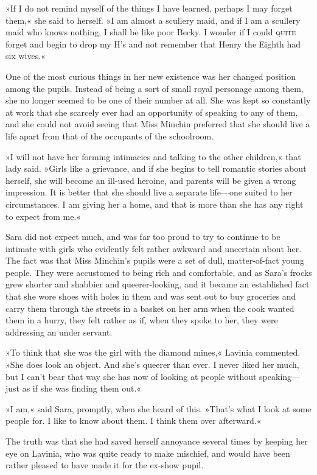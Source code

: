 »If I do not remind myself of the things I have learned, perhaps I may forget them,« she said to herself. »I am almost a scullery maid, and if I am a scullery maid who knows nothing, I shall be like poor Becky. I wonder if I could \textsc{quite} forget and begin to drop my H's and not remember that Henry the Eighth had six wives.«

One of the most curious things in her new existence was her changed position among the pupils. Instead of being a sort of small royal personage among them, she no longer seemed to be one of their number at all. She was kept so constantly at work that she scarcely ever had an opportunity of speaking to any of them, and she could not avoid seeing that Miss Minchin preferred that she should live a life apart from that of the occupants of the schoolroom.

»I will not have her forming intimacies and talking to the other children,« that lady said. »Girls like a grievance, and if she begins to tell romantic stories about herself, she will become an ill-used heroine, and parents will be given a wrong impression. It is better that she should live a separate life—one suited to her circumstances. I am giving her a home, and that is more than she has any right to expect from me.«

Sara did not expect much, and was far too proud to try to continue to be intimate with girls who evidently felt rather awkward and uncertain about her. The fact was that Miss Minchin's pupils were a set of dull, matter-of-fact young people. They were accustomed to being rich and comfortable, and as Sara's frocks grew shorter and shabbier and queerer-looking, and it became an established fact that she wore shoes with holes in them and was sent out to buy groceries and carry them through the streets in a basket on her arm when the cook wanted them in a hurry, they felt rather as if, when they spoke to her, they were addressing an under servant.

»To think that she was the girl with the diamond mines,« Lavinia commented. »She does look an object. And she's queerer than ever. I never liked her much, but I can't bear that way she has now of looking at people without speaking—just as if she was finding them out.«

»I am,« said Sara, promptly, when she heard of this. »That's what I look at some people for. I like to know about them. I think them over afterward.«

The truth was that she had saved herself annoyance several times by keeping her eye on Lavinia, who was quite ready to make mischief, and would have been rather pleased to have made it for the ex-show pupil.

